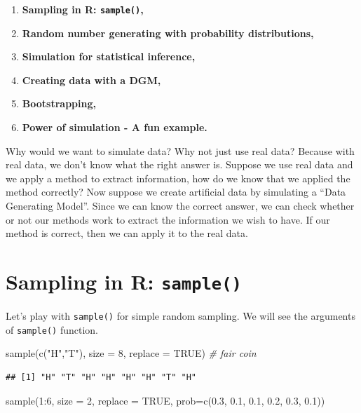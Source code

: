 \documentclass[
]{book}
\newenvironment{Shaded}{\begin{snugshade}}{\end{snugshade}}
\newcommand{\AttributeTok}[1]{\textcolor[rgb]{0.77,0.63,0.00}{#1}}
\newcommand{\CommentTok}[1]{\textcolor[rgb]{0.56,0.35,0.01}{\textit{#1}}}
\newcommand{\ConstantTok}[1]{\textcolor[rgb]{0.00,0.00,0.00}{#1}}
\newcommand{\DecValTok}[1]{\textcolor[rgb]{0.00,0.00,0.81}{#1}}
\newcommand{\FloatTok}[1]{\textcolor[rgb]{0.00,0.00,0.81}{#1}}
\newcommand{\FunctionTok}[1]{\textcolor[rgb]{0.00,0.00,0.00}{#1}}
\newcommand{\NormalTok}[1]{#1}
\newcommand{\SpecialCharTok}[1]{\textcolor[rgb]{0.00,0.00,0.00}{#1}}
\newcommand{\StringTok}[1]{\textcolor[rgb]{0.31,0.60,0.02}{#1}}
\providecommand{\tightlist}{%
  \setlength{\itemsep}{0pt}\setlength{\parskip}{0pt}}
\begin{document}
\begin{enumerate}
\def\labelenumi{\arabic{enumi}.}
\tightlist
\item
  \textbf{Sampling in R: \texttt{sample()},}
\item
  \textbf{Random number generating with probability distributions,}
\item
  \textbf{Simulation for statistical inference,}
\item
  \textbf{Creating data with a DGM,}
\item
  \textbf{Bootstrapping,}
\item
  \textbf{Power of simulation - A fun example.}
\end{enumerate}

Why would we want to simulate data? Why not just use real data? Because with real data, we don't know what the right answer is. Suppose we use real data and we apply a method to extract information, how do we know that we applied the method correctly? Now suppose we create artificial data by simulating a ``Data Generating Model''. Since we can know the correct answer, we can check whether or not our methods work to extract the information we wish to have. If our method is correct, then we can apply it to the real data.

\hypertarget{sampling-in-r-sample}{%
\section{\texorpdfstring{Sampling in R: \texttt{sample()}}{Sampling in R: sample()}}\label{sampling-in-r-sample}}

Let's play with \texttt{sample()} for simple random sampling. We will see the arguments of \texttt{sample()} function.

\begin{Shaded}
\begin{Highlighting}[]
\FunctionTok{sample}\NormalTok{(}\FunctionTok{c}\NormalTok{(}\StringTok{"H"}\NormalTok{,}\StringTok{"T"}\NormalTok{), }\AttributeTok{size =} \DecValTok{8}\NormalTok{, }\AttributeTok{replace =} \ConstantTok{TRUE}\NormalTok{)  }\CommentTok{\# fair coin}
\end{Highlighting}
\end{Shaded}

\begin{verbatim}
## [1] "H" "T" "H" "H" "H" "H" "T" "H"
\end{verbatim}

\begin{Shaded}
\begin{Highlighting}[]
\FunctionTok{sample}\NormalTok{(}\DecValTok{1}\SpecialCharTok{:}\DecValTok{6}\NormalTok{, }\AttributeTok{size =} \DecValTok{2}\NormalTok{, }\AttributeTok{replace =} \ConstantTok{TRUE}\NormalTok{, }\AttributeTok{prob=}\FunctionTok{c}\NormalTok{(}\FloatTok{0.3}\NormalTok{, }\FloatTok{0.1}\NormalTok{, }\FloatTok{0.1}\NormalTok{, }\FloatTok{0.2}\NormalTok{, }\FloatTok{0.3}\NormalTok{, }\FloatTok{0.1}\NormalTok{))}
\end{Highlighting}
\end{Shaded}
\end{document}
